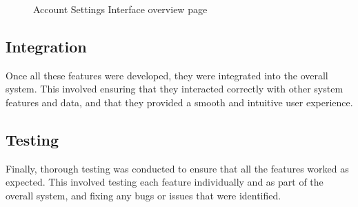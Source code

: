 \begin{figure}[H]
    \centering
    \caption{ Account Settings Interface overview page}
    \label{fig:Account-Settings-Interface-overview-page}
\end{figure}


\subsection{Integration}

Once all these features were developed, they were integrated into the overall system. This involved ensuring that they interacted correctly with other system features and data, and that they provided a smooth and intuitive user experience.

\subsection{Testing}

Finally, thorough testing was conducted to ensure that all the features worked as expected. This involved testing each feature individually and as part of the overall system, and fixing any bugs or issues that were identified.




